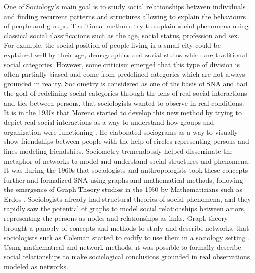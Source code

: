 One of Sociology's main goal is to study social relationships between individuals and finding recurrent patterns and structures allowing to explain the behaviours of people and groups.
Traditional methods try to explain social phenomena using classical social classifications such as the age, social status, profession and sex.
For example, the social position of people living in a small city could be explained well by their age, demographics and social status which are traditional social categories.
However, some criticism emerged that this type of division is often partially biased and come from predefined categories which are not always grounded in reality.
Sociometry is considered as one of the basis of SNA and had the goal of redefining social categories through the lens of real social interactions and ties between persons, that sociologists wanted to observe in real conditions.
It is in the 1930s that Moreno started to develop this new method by trying to depict real social interactions as a way to understand how groups and organization were functioning \cite{morenoFoundationsSociometryIntroduction1941}.
He elaborated sociograms as a way to visually show friendships between people with the help of circles representing persons and lines modeling friendships.
Sociometry tremendously helped disseminate the metaphor of networks to model and understand social structures and phenomena.
It was during the 1960s that sociologists and anthropologists took these concepts further and formalized SNA using graphs and mathematical methods, following the emergence of Graph Theory studies in the 1950 by Mathematicians such as Erdos \cite{erdos2011}.
Sociologists already had structural theories of social phenomena, and they rapidly saw the potential of graphs to model social relationships between actors, representing the persons as nodes and relationships as links.
Graph theory brought a panoply of concepts and methods to study and describe networks, that sociologists such as Coleman started to codify to use them in a sociology setting \cite{colemanIntroductionMathematicalSociology1964}.
Using mathematical and network methods, it was possible to formally describe social relationships to make sociological conclusions grounded in real observations modeled as networks.


